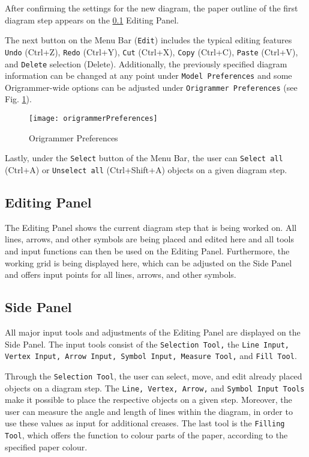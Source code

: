 After confirming the settings for the new diagram, the paper outline of the first diagram step appears on the \ref{sec:editingPanel} Editing Panel.

The next button on the Menu Bar (\texttt{Edit}) includes the typical editing features \texttt{Undo} (Ctrl+Z), \texttt{Redo} (Ctrl+Y), \texttt{Cut} (Ctrl+X), \texttt{Copy} (Ctrl+C), \texttt{Paste} (Ctrl+V), and \texttt{Delete} selection (Delete). Additionally, the previously specified diagram information can be changed at any point under \texttt{Model Preferences} and some Origrammer-wide options can be adjusted under \texttt{Origrammer Preferences} (see Fig. \ref{fig:origrammerPreferences}).

\begin{figure}[htbp]
	\centering
	\texttt{[image: origrammerPreferences]}
	\caption{Origrammer Preferences}
	\label{fig:origrammerPreferences}
\end{figure}

\noindent Lastly, under the \texttt{Select} button of the Menu Bar, the user can \texttt{Select all} (Ctrl+A) or \texttt{Unselect all} (Ctrl+Shift+A) objects on a given diagram step.

\subsection{Editing Panel}
\label{sec:editingPanel}

The Editing Panel shows the current diagram step that is being worked on. All lines, arrows, and other symbols are being placed and edited here and all tools and input functions can then be used on the Editing Panel. Furthermore, the working grid is being displayed here, which can be adjusted on the Side Panel and offers input points for all lines, arrows, and other symbols.

\subsection{Side Panel}
\label{sec:sidePanel}

All major input tools and adjustments of the Editing Panel are displayed on the Side Panel. The input tools consist of the \texttt{Selection Tool,} the \texttt{Line Input, Vertex Input, Arrow Input, Symbol Input, Measure Tool,} and \texttt{Fill Tool}.

Through the \texttt{Selection Tool}, the user can select, move, and edit already placed objects on a diagram step. The \texttt{Line, Vertex, Arrow,} and \texttt{Symbol Input Tools} make it possible to place the respective objects on a given step. Moreover, the user can measure the angle and length of lines within the diagram, in order to use these values as input for additional creases. The last tool is the \texttt{Filling Tool}, which offers the function to colour parts of the paper, according to the specified paper colour.

